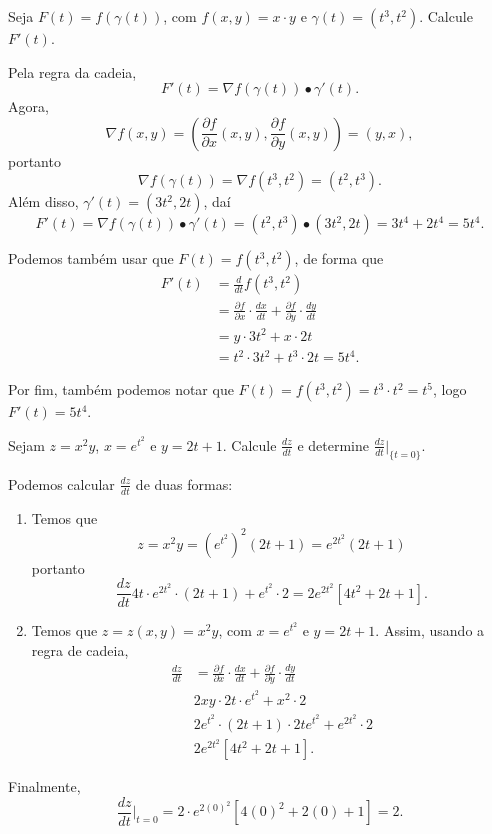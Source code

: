 \begin{example}
    Seja \(F(t) = f(\gamma(t))\), com \(f(x,y) = x\cdot y\) e \(\gamma(t) = (t^3,t^2)\). Calcule \(F'(t)\).

    Pela regra da cadeia, \[F'(t) = \nabla f(\gamma(t))\bullet \gamma'(t).\] Agora, \[\nabla f(x,y) = \left( \frac{\partial f}{\partial x} (x,y), \frac{\partial f}{\partial y} (x,y) \right) = (y,x),\] portanto \[\nabla f(\gamma(t)) = \nabla f(t^3,t^2) = (t^2,t^3).\] Além disso, \(\gamma'(t) = (3t^2,2t)\), daí \[F'(t) = \nabla f(\gamma(t))\bullet \gamma'(t) = (t^2,t^3)\bullet (3t^2,2t) = 3t^4 + 2t^4 = 5t^4.\]

    Podemos também usar que \(F(t) = f(t^3,t^2)\), de forma que
        \begin{align*}
            F'(t)
                & = \frac{d}{dt} f(t^3,t^2) \\
                & = \frac{\partial f}{\partial x} \cdot \frac{dx}{dt} + \frac{\partial f}{\partial y} \cdot \frac{dy}{dt} \\
                & = y \cdot 3t^2 + x\cdot 2t \\
                & = t^2\cdot 3t^2 + t^3\cdot 2t = 5t^4.
        \end{align*}

    Por fim, também podemos notar que \(F(t) = f(t^3,t^2) = t^3\cdot t^2 = t^5\), logo \(F'(t) = 5t^4.\)
\end{example}

\begin{example}
    Sejam \(z = x^2y\), \(x = e^{t^2}\) e \(y = 2t+1\). Calcule \(\frac{dz}{dt}\) e determine \(\frac{dz}{dt}\big|_{\{t=0\}}\).

    Podemos calcular \(\frac{dz}{dt}\) de duas formas:
        \begin{enumerate}
            \item Temos que \[z = x^2 y = (e^{t^2})^2(2t + 1) = e^{2t^2}(2t + 1)\] portanto \[\frac{dz}{dt} 4t\cdot e^{2t^2}\cdot (2t + 1) + e^{t^2}\cdot 2 = 2e^{2t^2}[4t^2 + 2t + 1].\]
            \item Temos que \(z = z(x,y) = x^2 y\), com \(x = e^{t^2}\) e \(y = 2t + 1\). Assim, usando a regra de cadeia,
                \begin{align*}
                    \frac{dz}{dt}
                        & = \frac{\partial f}{\partial x} \cdot \frac{dx}{dt} + \frac{\partial f}{\partial y} \cdot \frac{dy}{dt} \\
                        & 2xy \cdot 2t\cdot e^{t^2} + x^2\cdot 2 \\
                        & 2e^{t^2}\cdot(2t + 1)\cdot 2te^{t^2} + e^{2t^2}\cdot 2 \\
                        & 2e^{2t^2}[4t^2 + 2t + 1].
                \end{align*}
        \end{enumerate}
    
    Finalmente, \[\frac{dz}{dt}\bigg|_{t=0} = 2\cdot e^{2(0)^2}[4(0)^2 + 2(0) + 1] = 2.\]
\end{example}

